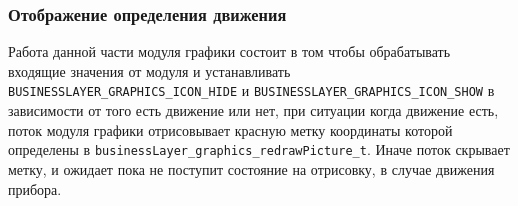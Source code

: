 \subsubsection{Отображение определения движения}

Работа данной части модуля графики состоит в том чтобы обрабатывать входящие значения от модуля \moduleMoveDetect и устанавливать \lstinline{BUSINESSLAYER_GRAPHICS_ICON_HIDE} и \lstinline{BUSINESSLAYER_GRAPHICS_ICON_SHOW}
в зависимости от того есть движение или нет, при ситуации когда движение есть, поток модуля графики отрисовывает красную метку координаты которой определены в \lstinline{businessLayer_graphics_redrawPicture_t}.
Иначе поток скрывает метку, и ожидает пока не поступит состояние на отрисовку, в случае движения прибора.

